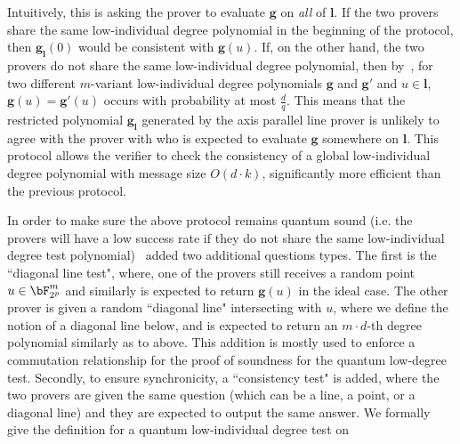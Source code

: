 Intuitively, this is asking the prover to evaluate $\textbf{g}$ on \emph{all} of $\textbf{l}$. If the two provers share the same low-individual degree polynomial in the beginning of the protocol, then $\textbf{g}_\textbf{l}(0)$ would be consistent with $\textbf{g}(u)$. If, on the other hand, the two provers do not share the same low-individual degree polynomial, then by~, for two different $m$-variant low-individual degree polynomials $\textbf{g}$ and $\textbf{g}'$ and $u \in \textbf{l}$, $\textbf{g}(u) = \textbf{g}'(u)$ occurs with probability at most $\frac{d}{q}$. This means that the restricted polynomial $\textbf{g}_\textbf{l}$ generated by the axis parallel line prover is unlikely to agree with the prover with who is expected to evaluate $\textbf{g}$ somewhere on $\textbf{l}$. This protocol allows the verifier to check the consistency of a global low-individual degree polynomial with message size $O(d \cdot k)$, significantly more efficient than the previous protocol. 

In order to make sure the above protocol remains quantum sound (i.e. the provers will have a low success rate if they do not share the same low-individual degree test polynomial)~\cite{jiQuantumSoundnessTesting2022} added two additional questions types. The first is the ``diagonal line test", where, one of the provers still receives a random point $u \in \bF_{2^p}^m$ and similarly is expected to return $\textbf{g}(u)$ in the ideal case. The other prover is given a random ``diagonal line" intersecting with $u$, where we define the notion of a diagonal line below, and is expected to return an $m \cdot d$-th degree polynomial similarly as to above. This addition is mostly used to enforce a commutation relationship for the proof of soundness for the quantum low-degree test. Secondly, to ensure synchronicity, a ``consistency test" is added, where the two provers are given the same question (which can be a line, a point, or a diagonal line) and they are expected to output the same answer. We formally give the definition for a quantum low-individual degree test on~


